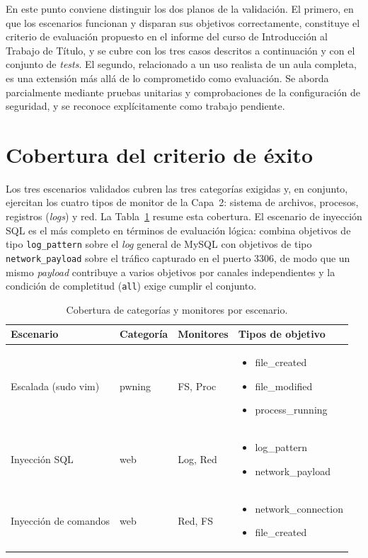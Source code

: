 En este punto conviene distinguir los dos planos de la validación. El primero,
en que los escenarios funcionan y disparan sus objetivos correctamente,
constituye el criterio de evaluación propuesto en el informe del curso de
Introducción al Trabajo de Título, y se cubre con los tres casos descritos a
continuación y con el conjunto de \textit{tests}. El segundo, relacionado a un
uso realista de un aula completa, es una extensión más allá de lo comprometido
como evaluación. Se aborda parcialmente mediante pruebas unitarias y
comprobaciones de la configuración de seguridad, y se reconoce explícitamente
como trabajo pendiente.

\section{Cobertura del criterio de éxito}

Los tres escenarios validados cubren las tres categorías exigidas y, en
conjunto, ejercitan los cuatro tipos de monitor de la Capa~2: sistema de
archivos, procesos, registros (\textit{logs}) y red.
La Tabla~\ref{tab:cobertura}
resume esta cobertura. El escenario de inyección SQL es el más completo en
términos de evaluación lógica: combina objetivos de tipo \texttt{log\_pattern}
sobre el \textit{log} general de MySQL con objetivos de tipo
\texttt{network\_payload} sobre el tráfico capturado en el puerto 3306, de modo
que un mismo \textit{payload} contribuye a varios objetivos por canales
independientes y la condición de completitud (\texttt{all}) exige cumplir el
conjunto.

\begin{table}[h]
\centering
\caption{Cobertura de categorías y monitores por escenario.}
\label{tab:cobertura}
\begin{tabular}{|p{4.5cm}|p{2cm}|p{2cm}|p{5cm}|}
\hline
\textbf{Escenario} & \textbf{Categoría} & \textbf{Monitores} &
\textbf{Tipos de objetivo} \\
\hline
Escalada (sudo vim)    & pwning & FS, Proc        &
\begin{itemize}[nosep, leftmargin=*]
\item file\_created
\item file\_modified
\item process\_running
\end{itemize} \\
\hline
Inyección SQL          & web    & Log, Red        &
\begin{itemize}[nosep, leftmargin=*]
\item log\_pattern
\item network\_payload
\end{itemize} \\
\hline
Inyección de comandos  & web    & Red, FS         &
\begin{itemize}[nosep, leftmargin=*]
\item network\_connection
\item file\_created
\end{itemize} \\
\hline
\end{tabular}
\end{table}

